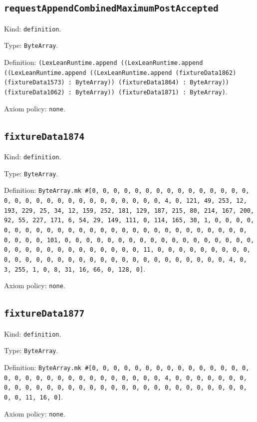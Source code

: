 \documentclass[11pt]{article}
\begin{document}
\subsection*{\texttt{requestAppendCombinedMaximumPostAccepted}}
\noindent Kind: \texttt{definition}.\par
\noindent Type: \texttt{ByteArray}.\par
\noindent Definition: \texttt{(LexLeanRuntime.append ((LexLeanRuntime.append ((LexLeanRuntime.append ((LexLeanRuntime.append (fixtureData1862) (fixtureData1573) : ByteArray)) (fixtureData1864) : ByteArray)) (fixtureData1062) : ByteArray)) (fixtureData1871) : ByteArray)}.\par
\noindent Axiom policy: \texttt{none}.\par
\subsection*{\texttt{fixtureData1874}}
\noindent Kind: \texttt{definition}.\par
\noindent Type: \texttt{ByteArray}.\par
\noindent Definition: \texttt{ByteArray.mk \#[0, 0, 0, 0, 0, 0, 0, 0, 0, 0, 0, 0, 0, 0, 0, 0, 0, 0, 0, 0, 0, 0, 0, 0, 0, 0, 0, 0, 0, 0, 4, 0, 121, 49, 253, 12, 193, 229, 25, 34, 12, 159, 252, 181, 129, 187, 215, 80, 214, 167, 200, 92, 55, 227, 171, 6, 54, 29, 149, 111, 0, 114, 165, 30, 1, 0, 0, 0, 0, 0, 0, 0, 0, 0, 0, 0, 0, 0, 0, 0, 0, 0, 0, 0, 0, 0, 0, 0, 0, 0, 0, 0, 0, 0, 0, 0, 101, 0, 0, 0, 0, 0, 0, 0, 0, 0, 0, 0, 0, 0, 0, 0, 0, 0, 0, 0, 0, 0, 0, 0, 0, 0, 0, 0, 0, 0, 0, 0, 11, 0, 0, 0, 0, 0, 0, 0, 0, 0, 0, 0, 0, 0, 0, 0, 0, 0, 0, 0, 0, 0, 0, 0, 0, 0, 0, 0, 0, 0, 0, 4, 0, 3, 255, 1, 0, 8, 31, 16, 66, 0, 128, 0]}.\par
\noindent Axiom policy: \texttt{none}.\par
\subsection*{\texttt{fixtureData1877}}
\noindent Kind: \texttt{definition}.\par
\noindent Type: \texttt{ByteArray}.\par
\noindent Definition: \texttt{ByteArray.mk \#[0, 0, 0, 0, 0, 0, 0, 0, 0, 0, 0, 0, 0, 0, 0, 0, 0, 0, 0, 0, 0, 0, 0, 0, 0, 0, 0, 0, 0, 0, 4, 0, 0, 0, 0, 0, 0, 0, 0, 0, 0, 0, 0, 0, 0, 0, 0, 0, 0, 0, 0, 0, 0, 0, 0, 0, 0, 0, 0, 0, 0, 0, 0, 11, 16, 0]}.\par
\noindent Axiom policy: \texttt{none}.\par
\end{document}
